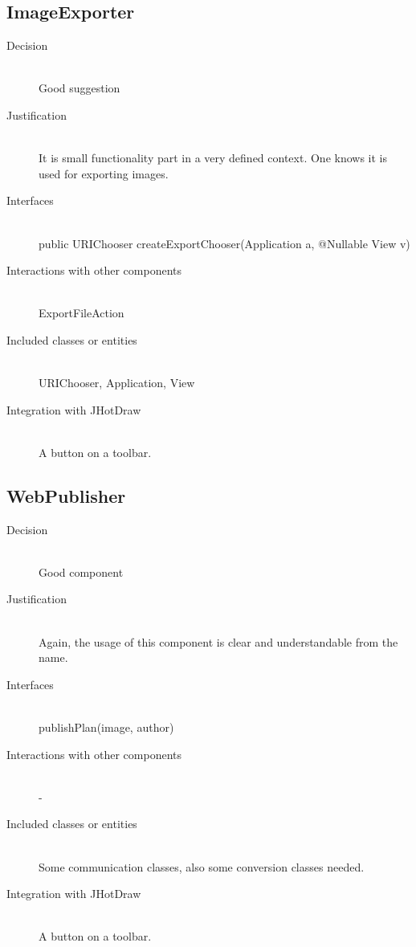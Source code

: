 \subsection{ImageExporter}
	\begin{description}
		\item[Decision] \hfill \\ Good suggestion
		\item[Justification] \hfill \\ It is small functionality part in a very defined context. One knows it is used for exporting images.
		\item[Interfaces] \hfill \\ public URIChooser createExportChooser(Application a, @Nullable View v)
		\item[Interactions with other components] \hfill \\ ExportFileAction
		\item[Included classes or entities] \hfill \\ URIChooser, Application, View
		\item[Integration with JHotDraw] \hfill \\ A button on a toolbar.
	\end{description}

\subsection{WebPublisher}
	\begin{description}
		\item[Decision] \hfill \\ Good component
		\item[Justification] \hfill \\ Again, the usage of this component is clear and understandable from the name.
		\item[Interfaces] \hfill \\ publishPlan(image, author)
		\item[Interactions with other components] \hfill \\ -
		\item[Included classes or entities] \hfill \\ Some communication classes, also some conversion classes needed.
		\item[Integration with JHotDraw] \hfill \\ A button on a toolbar.
	\end{description}

